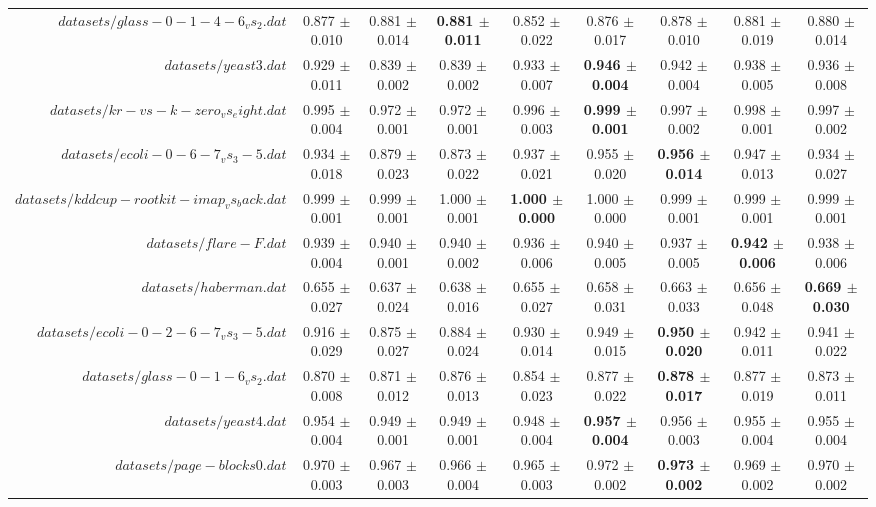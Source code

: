 \begin{table}[!ht]
{\begin{tabular}{r c c c c c c c c}
$datasets/glass-0-1-4-6_vs_2.dat$ & 0.877 $\pm$ 0.010 & 0.881 $\pm$ 0.014 & \textbf{0.881 $\pm$ 0.011} & 0.852 $\pm$ 0.022 & 0.876 $\pm$ 0.017 & 0.878 $\pm$ 0.010 & 0.881 $\pm$ 0.019 & 0.880 $\pm$ 0.014 \\
$datasets/yeast3.dat$ & 0.929 $\pm$ 0.011 & 0.839 $\pm$ 0.002 & 0.839 $\pm$ 0.002 & 0.933 $\pm$ 0.007 & \textbf{0.946 $\pm$ 0.004} & 0.942 $\pm$ 0.004 & 0.938 $\pm$ 0.005 & 0.936 $\pm$ 0.008 \\
$datasets/kr-vs-k-zero_vs_eight.dat$ & 0.995 $\pm$ 0.004 & 0.972 $\pm$ 0.001 & 0.972 $\pm$ 0.001 & 0.996 $\pm$ 0.003 & \textbf{0.999 $\pm$ 0.001} & 0.997 $\pm$ 0.002 & 0.998 $\pm$ 0.001 & 0.997 $\pm$ 0.002 \\
$datasets/ecoli-0-6-7_vs_3-5.dat$ & 0.934 $\pm$ 0.018 & 0.879 $\pm$ 0.023 & 0.873 $\pm$ 0.022 & 0.937 $\pm$ 0.021 & 0.955 $\pm$ 0.020 & \textbf{0.956 $\pm$ 0.014} & 0.947 $\pm$ 0.013 & 0.934 $\pm$ 0.027 \\
$datasets/kddcup-rootkit-imap_vs_back.dat$ & 0.999 $\pm$ 0.001 & 0.999 $\pm$ 0.001 & 1.000 $\pm$ 0.001 & \textbf{1.000 $\pm$ 0.000} & 1.000 $\pm$ 0.000 & 0.999 $\pm$ 0.001 & 0.999 $\pm$ 0.001 & 0.999 $\pm$ 0.001 \\
$datasets/flare-F.dat$ & 0.939 $\pm$ 0.004 & 0.940 $\pm$ 0.001 & 0.940 $\pm$ 0.002 & 0.936 $\pm$ 0.006 & 0.940 $\pm$ 0.005 & 0.937 $\pm$ 0.005 & \textbf{0.942 $\pm$ 0.006} & 0.938 $\pm$ 0.006 \\
$datasets/haberman.dat$ & 0.655 $\pm$ 0.027 & 0.637 $\pm$ 0.024 & 0.638 $\pm$ 0.016 & 0.655 $\pm$ 0.027 & 0.658 $\pm$ 0.031 & 0.663 $\pm$ 0.033 & 0.656 $\pm$ 0.048 & \textbf{0.669 $\pm$ 0.030} \\
$datasets/ecoli-0-2-6-7_vs_3-5.dat$ & 0.916 $\pm$ 0.029 & 0.875 $\pm$ 0.027 & 0.884 $\pm$ 0.024 & 0.930 $\pm$ 0.014 & 0.949 $\pm$ 0.015 & \textbf{0.950 $\pm$ 0.020} & 0.942 $\pm$ 0.011 & 0.941 $\pm$ 0.022 \\
$datasets/glass-0-1-6_vs_2.dat$ & 0.870 $\pm$ 0.008 & 0.871 $\pm$ 0.012 & 0.876 $\pm$ 0.013 & 0.854 $\pm$ 0.023 & 0.877 $\pm$ 0.022 & \textbf{0.878 $\pm$ 0.017} & 0.877 $\pm$ 0.019 & 0.873 $\pm$ 0.011 \\
$datasets/yeast4.dat$ & 0.954 $\pm$ 0.004 & 0.949 $\pm$ 0.001 & 0.949 $\pm$ 0.001 & 0.948 $\pm$ 0.004 & \textbf{0.957 $\pm$ 0.004} & 0.956 $\pm$ 0.003 & 0.955 $\pm$ 0.004 & 0.955 $\pm$ 0.004 \\
$datasets/page-blocks0.dat$ & 0.970 $\pm$ 0.003 & 0.967 $\pm$ 0.003 & 0.966 $\pm$ 0.004 & 0.965 $\pm$ 0.003 & 0.972 $\pm$ 0.002 & \textbf{0.973 $\pm$ 0.002} & 0.969 $\pm$ 0.002 & 0.970 $\pm$ 0.002 \\

\end{tabular}}
\end{table}
